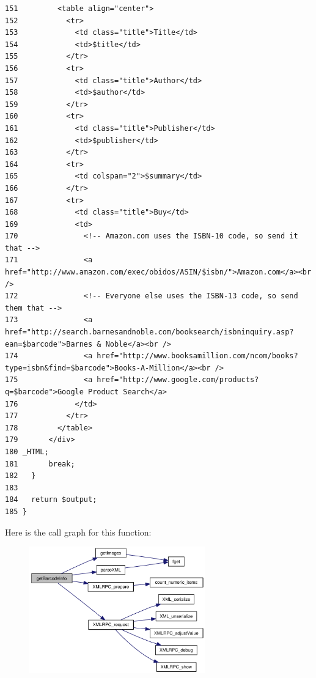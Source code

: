 \begin{Code}
\begin{verbatim}
151         <table align="center">
152           <tr>
153             <td class="title">Title</td>
154             <td>$title</td>
155           </tr>
156           <tr>
157             <td class="title">Author</td>
158             <td>$author</td>
159           </tr>
160           <tr>
161             <td class="title">Publisher</td>
162             <td>$publisher</td>
163           </tr>
164           <tr>
165             <td colspan="2">$summary</td>
166           </tr>
167           <tr>
168             <td class="title">Buy</td>
169             <td>
170               <!-- Amazon.com uses the ISBN-10 code, so send it that -->
171               <a href="http://www.amazon.com/exec/obidos/ASIN/$isbn/">Amazon.com</a><br />
172               <!-- Everyone else uses the ISBN-13 code, so send them that -->
173               <a href="http://search.barnesandnoble.com/booksearch/isbninquiry.asp?ean=$barcode">Barnes & Noble</a><br />
174               <a href="http://www.booksamillion.com/ncom/books?type=isbn&find=$barcode">Books-A-Million</a><br />
175               <a href="http://www.google.com/products?q=$barcode">Google Product Search</a>
176             </td>
177           </tr>
178         </table>
179       </div>
180 _HTML;
181       break;
182   }
183 
184   return $output;
185 }\end{verbatim}
\end{Code}




Here is the call graph for this function:\nopagebreak
\begin{figure}[H]
\begin{center}
\leavevmode
\includegraphics[width=215pt]{barcode_8inc_e10c37e4f9f9b7c6617a388351a27c99_cgraph}
\end{center}
\end{figure}

